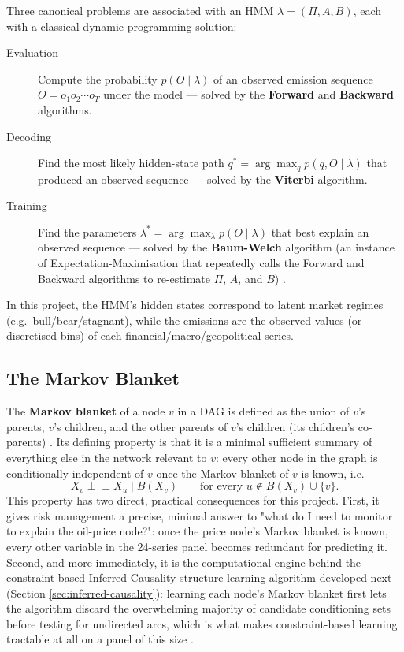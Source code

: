Three canonical problems are associated with an HMM $\lambda = (\Pi, A, B)$,
each with a classical dynamic-programming solution:
\begin{description}
  \item[Evaluation] Compute the probability $p(O \mid \lambda)$ of an
    observed emission sequence $O = o_1 o_2 \cdots o_T$ under the model —
    solved by the \textbf{Forward} and \textbf{Backward} algorithms.
  \item[Decoding] Find the most likely hidden-state path
    $q^* = \arg\max_{q} p(q, O \mid \lambda)$ that produced an observed
    sequence — solved by the \textbf{Viterbi} algorithm.
  \item[Training] Find the parameters $\lambda^* = \arg\max_{\lambda}
    p(O \mid \lambda)$ that best explain an observed sequence — solved by
    the \textbf{Baum-Welch} algorithm (an instance of Expectation-Maximisation
    that repeatedly calls the Forward and Backward algorithms to re-estimate
    $\Pi$, $A$, and $B$) \autocite{rabiner1986hmm}.
\end{description}
In this project, the HMM's hidden states correspond to latent market regimes (e.g.\ bull/bear/stagnant), while the emissions are the observed values (or discretised bins) of each financial/macro/geopolitical
series.

\subsection{The Markov Blanket}

The \textbf{Markov blanket} of a node $v$ in a DAG is defined as the union of
$v$'s parents, $v$'s children, and the other parents of $v$'s children (its
children's co-parents) \autocite{pearl1988probabilistic}. Its defining
property is that it is a minimal sufficient summary of everything else in the network relevant to $v$: every other node in the graph is conditionally independent of $v$ once the Markov blanket of $v$ is known,
i.e.\
\[
  X_v \perp\!\!\!\perp X_u \mid B(X_v) \qquad \text{for every } u \notin B(X_v) \cup \{v\}.
\]
This property has two direct, practical consequences for this project.
First, it gives risk management a precise, minimal answer to "what do I need
to monitor to explain the oil-price node?": once the price node's Markov
blanket is known, every other variable in the 24-series panel becomes
redundant for predicting it. Second, and more immediately, it is the
computational engine behind the constraint-based Inferred Causality
structure-learning algorithm developed next (Section
\ref{sec:inferred-causality}): learning each node's Markov blanket first lets
the algorithm discard the overwhelming majority of candidate conditioning
sets before testing for undirected arcs, which is what makes constraint-based
learning tractable at all on a panel of this size
\autocite{pellet2008markov}.
